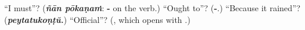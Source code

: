 \begin{tcolorbox}[breakable,colback=teal!4,colframe=teal!35!black,title={Before you move on}]
\textquotedblleft{}I must\textquotedblright{}? (\emph{\textbf{ñān pōkaṇaṁ}}: \textbf{-} on the verb.) \textquotedblleft{}Ought to\textquotedblright{}? (\textbf{-}.) \textquotedblleft{}Because it rained\textquotedblright{}? (\emph{\textbf{peytatukoṇṭŭ.}}) \textquotedblleft{}Official\textquotedblright{}? (\textbf{}, which opens with \textbf{}.)
\end{tcolorbox}
